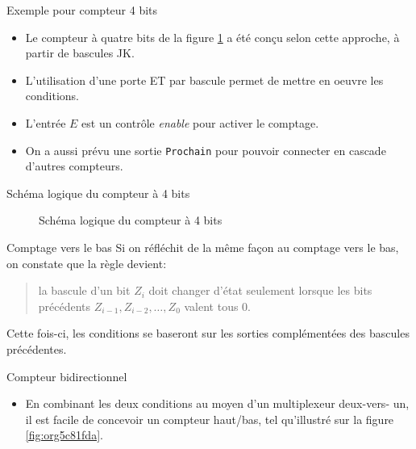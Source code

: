 \documentclass[presentation]{beamer}
\begin{document}
\begin{frame}[label={sec:org35c303f},fragile]{Exemple pour compteur 4 bits}
 \begin{itemize}
\item Le compteur à quatre bits de la figure \ref{fig:orgfdb416b} a été conçu selon cette approche, à partir de bascules JK.

\item L'utilisation d'une porte ET par bascule permet de mettre en oeuvre les conditions.

\item L'entrée \(E\) est un contrôle \emph{enable} pour activer le comptage.

\item On a aussi prévu une sortie \texttt{Prochain} pour pouvoir connecter en cascade d'autres compteurs.
\end{itemize}
\end{frame}

\begin{frame}[label={sec:org450c357}]{Schéma logique du compteur à 4 bits}
\begin{figure}[htbp]
\centering

\caption{\label{fig:orgfdb416b}Schéma logique du compteur à 4 bits}
\end{figure}
\end{frame}

\begin{frame}[label={sec:org3b12a37}]{Comptage vers le bas}
Si on réfléchit de la même façon au comptage vers le bas, on constate
que la règle devient:

\begin{quote}
la bascule d'un bit \(Z_i\) doit changer d'état
seulement lorsque les bits précédents \(Z_{i-1},Z_{i-2},\ldots, Z_0\)
valent tous 0.
\end{quote}

Cette fois-ci, les conditions se baseront sur les sorties
complémentées des bascules précédentes.
\end{frame}

\begin{frame}[label={sec:org1a1ca1e}]{Compteur bidirectionnel}
\begin{itemize}
\item En combinant les deux conditions au moyen d'un multiplexeur deux-vers- un, il est facile de concevoir un compteur haut/bas, tel qu'illustré sur la figure \ref{fig:org5c81fda}.
\end{itemize}
\end{frame}
\end{document}
